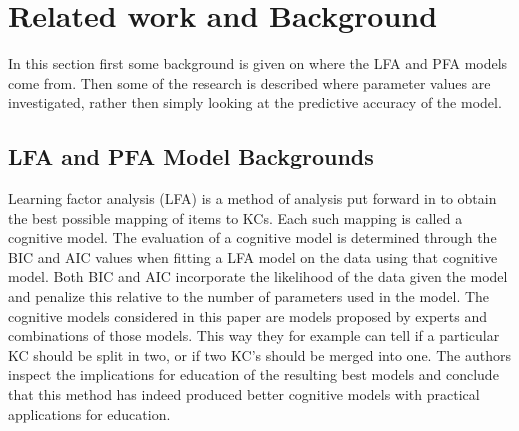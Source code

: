 \documentclass{scrartcl}
\newcommand\todo[1]{\textit{\textcolor{red}{#1}}}
\begin{document}

\section{Related work and Background}
\label{sec:RW}
In this section first some background is given on where the LFA and PFA models come from. Then some of the research is described where parameter values are investigated, rather then simply looking at the predictive accuracy of the model. 
\subsection{LFA and PFA Model Backgrounds}
Learning factor analysis (LFA) is a method of analysis put forward in \cite{lfa} to obtain the best possible mapping of items to KCs. Each such mapping is called a cognitive model. The evaluation of a cognitive model is determined through the BIC and AIC values when fitting a LFA model on the data using that cognitive model. Both BIC and AIC incorporate the likelihood of the data given the model and penalize this relative to the number of parameters used in the model. The cognitive models considered in this paper are models proposed by experts and combinations of those models. This way they for example can tell if a particular KC should be split in two, or if two KC's should be merged into one. The authors inspect the implications for education of the resulting best models and conclude that this method has indeed produced better cognitive models with practical applications for education. 
\end{document}

